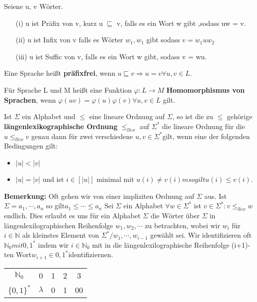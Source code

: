     Seiene u, v Wörter.
    \begin{itemize}
        \item [(i)] u ist Präfix von v, kurz u \(\sqsubseteq\) v, falls es ein Wort w gibt ,sodass uw = v.
        \item [(ii)] u ist Infix von v falls es Wörter \(w_{1}, w_{1}\) gibt sodass \(v = w_{1} u w_{2}\)
        \item [(iii)] u ist Suffic von v, falls es ein Wort w gibt, sodass v = wu.
    \end{itemize}

    Eine Sprache heißt \textbf{präfixfrei}, wenn \(u\sqsubseteq v \Rightarrow u = v \forall u,v \in L\).

    Für Sprache L und M heißt eine Funktion \(\varphi : L \rightarrow M\) \textbf{Homomorphismus von Sprachen}, wenn \(\varphi(uv) = \varphi (u) \varphi (v) \forall u, v \in L\) gilt.

    Ist \(\Sigma\) ein Alphabet und \(\leq\)  eine lineare Ordnung auf \(\Sigma\), so ist die zu \(\leq\)  gehörige \textbf{längenlexikographische Ordnung} \(\leq_{llex}\) auf \(\Sigma^{*}\) die lineare Ordnung für die \(u \leq_{llex} v\) genau dann für zwei verschiedene \(u, v\in \Sigma^{*} \)gilt, wenn eine der folgenden Bedingungen gilt:
\begin{itemize}
    \item \(\lvert u \rvert < \lvert v \rvert\)
    \item \(\lvert u \rvert = \lvert v \rvert\) und ist \(i \in [|u|]\) minimal mit 
    \(u(i) \neq v(i)m so gilt u(i) \leq v(i)\).
\end{itemize}
\textbf{Bemerkung: }Oft gehen wir von einer impliziten Ordnung auf \(\Sigma\) aus. Ist \(\Sigma = {a_{1}, \cdots, a_{n}}\) so gilt\( a_{1}\leq \cdots \leq a_{n}
\)
    Sei \(\Sigma\) ein Alphabet \(\forall w \in \Sigma^{*}\) ist \({v\in \Sigma^{*} : v \leq_{llex}w}\) endlich. Dies erlaubt es uns für ein Alphabet \(\Sigma\) die Wörter über \(\Sigma\) in längenlexilographischen Reihenfolge \(w_{1}, w_{2}, \cdots\) zu betrachten, wobei wir \(w_{i}\) für \(i \in \mathbb{N}\) als kleinstes Element von \(\Sigma^{*}/{w_{1},\cdots, w_{i-1}}\) gewählt sei. Wir identifizieren oft \(\mathbb{N}_{0} mit {0, 1}^{*}\) indem wir \(i \in \mathbb{N}_{0}\) mit in die längenlexilographische Reihenfolge (i+1)-ten Wort\( w_{i+1} \in {0,1}^{*} \)identifiziernen.
    \begin{center}
        \begin{tabular}{ c c c c c }
            \(\mathbb{N}_{0}\) & 0 & 1 & 2 & 3\\ 
            \(\{0, 1\}^{*}\) & \(\lambda\) & 0 & 1 & 00\\
        \end{tabular}
    \end{center}

